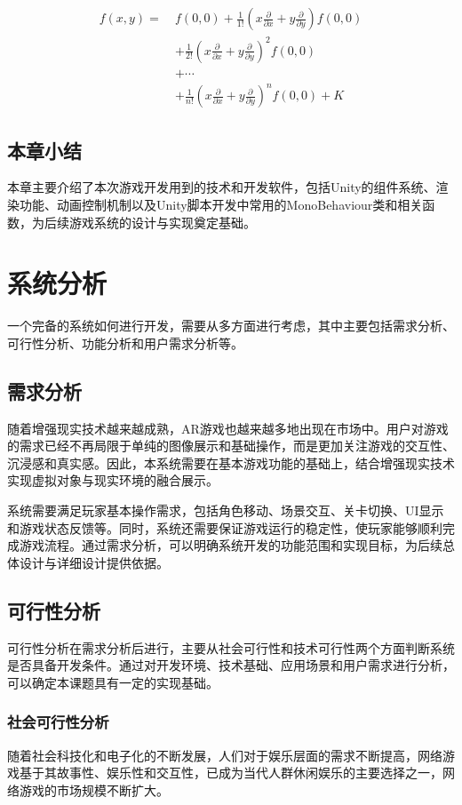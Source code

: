\documentclass[12pt]{graduate-design-manual}
\begin{document}
\begin{equation}
\begin{aligned}
f(x,y) =\ & f(0,0) + \frac{1}{1!}\left(x\frac{\partial}{\partial x} + y\frac{\partial}{\partial y}\right)f(0,0) \\
& + \frac{1}{2!}\left(x\frac{\partial}{\partial x} + y\frac{\partial}{\partial y}\right)^2 f(0,0) \\
& + \cdots \\
& + \frac{1}{n!}\left(x\frac{\partial}{\partial x} + y\frac{\partial}{\partial y}\right)^n f(0,0) + K
\end{aligned}
\end{equation}

\subsection{本章小结}
本章主要介绍了本次游戏开发用到的技术和开发软件，包括Unity的组件系统、渲染功能、动画控制机制以及Unity脚本开发中常用的MonoBehaviour类和相关函数，为后续游戏系统的设计与实现奠定基础。
\section{系统分析}
一个完备的系统如何进行开发，需要从多方面进行考虑，其中主要包括需求分析、可行性分析、功能分析和用户需求分析等。

\subsection{需求分析}
随着增强现实技术越来越成熟，AR游戏也越来越多地出现在市场中。用户对游戏的需求已经不再局限于单纯的图像展示和基础操作，而是更加关注游戏的交互性、沉浸感和真实感。因此，本系统需要在基本游戏功能的基础上，结合增强现实技术实现虚拟对象与现实环境的融合展示。

系统需要满足玩家基本操作需求，包括角色移动、场景交互、关卡切换、UI显示和游戏状态反馈等。同时，系统还需要保证游戏运行的稳定性，使玩家能够顺利完成游戏流程。通过需求分析，可以明确系统开发的功能范围和实现目标，为后续总体设计与详细设计提供依据。

\subsection{可行性分析}
可行性分析在需求分析后进行，主要从社会可行性和技术可行性两个方面判断系统是否具备开发条件。通过对开发环境、技术基础、应用场景和用户需求进行分析，可以确定本课题具有一定的实现基础。

\subsubsection{社会可行性分析}
随着社会科技化和电子化的不断发展，人们对于娱乐层面的需求不断提高，网络游戏基于其故事性、娱乐性和交互性，已成为当代人群休闲娱乐的主要选择之一，网络游戏的市场规模不断扩大。
\end{document}
